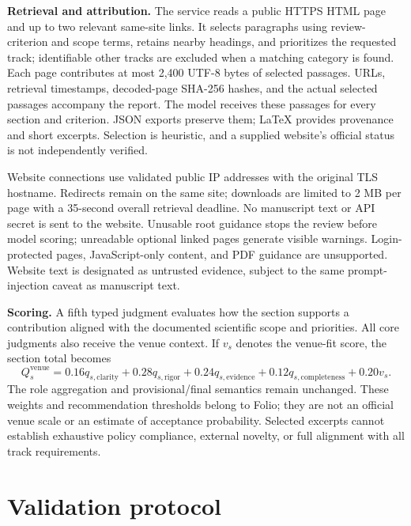 \documentclass[11pt]{article}
\begin{document}
\textbf{Retrieval and attribution.} The service reads a public HTTPS HTML page and up to two relevant same-site links. It selects paragraphs using review-criterion and scope terms, retains nearby headings, and prioritizes the requested track; identifiable other tracks are excluded when a matching category is found. Each page contributes at most 2,400 UTF-8 bytes of selected passages. URLs, retrieval timestamps, decoded-page SHA-256 hashes, and the actual selected passages accompany the report. The model receives these passages for every section and criterion. JSON exports preserve them; LaTeX provides provenance and short excerpts. Selection is heuristic, and a supplied website's official status is not independently verified.

Website connections use validated public IP addresses with the original TLS hostname. Redirects remain on the same site; downloads are limited to 2 MB per page with a 35-second overall retrieval deadline. No manuscript text or API secret is sent to the website. Unusable root guidance stops the review before model scoring; unreadable optional linked pages generate visible warnings. Login-protected pages, JavaScript-only content, and PDF guidance are unsupported. Website text is designated as untrusted evidence, subject to the same prompt-injection caveat as manuscript text.

\textbf{Scoring.} A fifth typed judgment evaluates how the section supports a contribution aligned with the documented scientific scope and priorities. All core judgments also receive the venue context. If $v_s$ denotes the venue-fit score, the section total becomes
\begin{equation}
Q_s^{\mathrm{venue}}=0.16q_{s,\mathrm{clarity}}+0.28q_{s,\mathrm{rigor}}+
0.24q_{s,\mathrm{evidence}}+0.12q_{s,\mathrm{completeness}}+0.20v_s.
\end{equation}
The role aggregation and provisional/final semantics remain unchanged. These weights and recommendation thresholds belong to Folio; they are not an official venue scale or an estimate of acceptance probability. Selected excerpts cannot establish exhaustive policy compliance, external novelty, or full alignment with all track requirements.

\section{Validation protocol}
\end{document}
